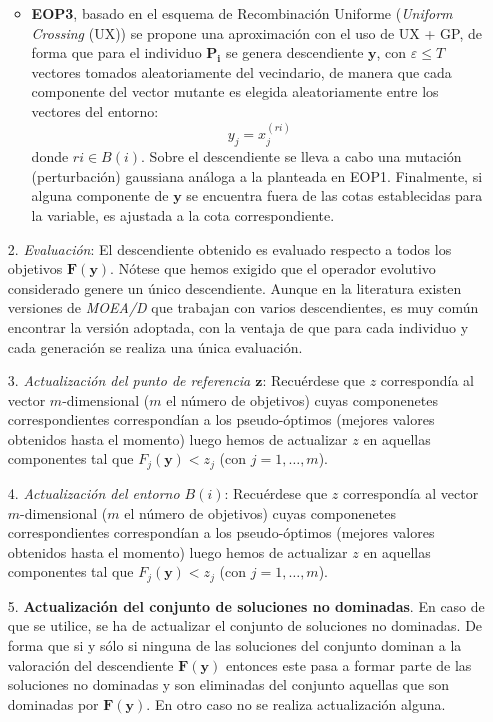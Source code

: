 \begin{enumerate}
\begin{itemize}
        \item \textbf{EOP3}, basado en el esquema de Recombinación Uniforme (\textit{Uniform Crossing} (UX)) se propone una aproximación con el uso de UX + GP, de forma que para el individuo $\boldsymbol{P_{i}}$ se genera descendiente $\boldsymbol{y}$, con $\varepsilon \leq T$ vectores tomados aleatoriamente del vecindario, de manera que cada componente del vector mutante es elegida aleatoriamente entre los vectores del entorno: $$ y_j = x^{(ri)}_{j}$$ donde $ri \in B(i)$. Sobre el descendiente se lleva a cabo una mutación (perturbación) gaussiana análoga a la planteada en EOP1. Finalmente, si alguna componente de $\boldsymbol{y}$ se encuentra fuera de las cotas establecidas para la variable,  es ajustada a la cota correspondiente.\\
    \end{itemize}

    \item[2.] \textit{Evaluación}: El descendiente obtenido es evaluado respecto a todos los objetivos $\boldsymbol{F}(\boldsymbol{y})$. Nótese que hemos exigido que el operador evolutivo considerado genere un único descendiente. Aunque en la literatura existen versiones de \textit{MOEA/D} que trabajan con varios descendientes, es muy común encontrar la versión adoptada, con la ventaja de que para cada individuo y cada generación se realiza una única evaluación. \\
    
    \item[3.] \textit{Actualización del punto de referencia $\boldsymbol{z}$}: Recuérdese que $z$ correspondía al vector $m$-dimensional ($m$ el número de objetivos) cuyas componenetes correspondientes correspondían a los pseudo-óptimos (mejores valores obtenidos hasta el momento) luego hemos de actualizar $z$ en aquellas componentes tal que $F_j(\boldsymbol{y}) < z_j$ (con $j=1,\dots,m$).\\
    
    \item[4.] \textit{Actualización del entorno $B(i)$}: Recuérdese que $z$ correspondía al vector $m$-dimensional ($m$ el número de objetivos) cuyas componenetes correspondientes correspondían a los pseudo-óptimos (mejores valores obtenidos hasta el momento) luego hemos de actualizar $z$ en aquellas componentes tal que $F_j(\boldsymbol{y}) < z_j$ (con $j=1,\dots,m$).\\

      \item[5.] \textbf{Actualización del conjunto de soluciones no dominadas}. En caso de que se utilice, se ha de actualizar el conjunto de soluciones no dominadas. De forma que si y sólo si ninguna de las soluciones del conjunto dominan a la valoración del descendiente $\boldsymbol{F}(\boldsymbol{y})$ entonces este pasa a formar parte de las soluciones no dominadas y son eliminadas del conjunto aquellas que son dominadas por $\boldsymbol{F}(\boldsymbol{y})$. En otro caso no se realiza actualización alguna. \\
\end{enumerate}

